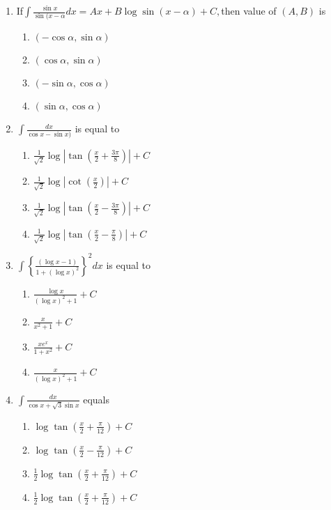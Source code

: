\documentclass[journal,12pt,twocolumn]{IEEEtran}
\theoremstyle{remark}
\begin{document}
 \begin{enumerate}
\item If$\int$$\frac{\sin x}{\sin (x-\alpha}dx = Ax+B\log \sin (x-\alpha)+C,$then value of $(A,B)$ is    \hfill        {}
\begin{enumerate}
       \item { $(-\cos \alpha, \sin \alpha)$ }  
       \item  $(\cos \alpha,\sin \alpha)$
       \item    $(-\sin \alpha,\cos \alpha)$   
       \item  $(\sin \alpha,\cos \alpha)$ 
\end{enumerate}

\item   $\int\frac{dx}{\cos x-\sin x)}$ is equal to             \hfill {}
      \begin{enumerate}
\item  $\frac{1}{\sqrt{2}}\log \left|\tan \left(\frac{x}{2}+\frac{3\pi}{8}\right)\right|+C$

\item  $\frac{1}{\sqrt{2}}\log \left|\cot \left(\frac{x}{2}\right)\right|+C$ 

\item  {$\frac{1}{\sqrt{2}}\log \left|\tan \left(\frac{x}{2}-\frac{3\pi}{8}\right)\right|+C$}

\item  {$\frac{1}{\sqrt{2}}\log \left|\tan \left(\frac{x}{2}-\frac{\pi}{8}\right)\right|+C$}
\end{enumerate}
\item  $\int\left\{ \frac{(\log x-1)}{1+(\log x)^2}\right\}^2 dx$ is equal to     \hfill {}
 \begin{enumerate} 
\item  $\frac{\log x}{(\log x)^2 +1}+C$         
\item  $\frac{x}{x^2+1}+C$
\item  $\frac{xe^x}{1+x^2}+C$                       
\item  $\frac{x}{(\log x)^2+1}+C$
\end{enumerate}
\item $\int \frac{dx}{\cos x + \sqrt{3} \sin x}$ equals \hfill {}
  \begin{enumerate}
\item  $\log \tan \left(\frac{x}{2}+\frac{\pi}{12}\right)+C$
\item  $\log \tan \left(\frac{x}{2}-\frac{\pi}{12}\right)+C$
\item  $\frac{1}{2} \log \tan \left(\frac{x}{2}+\frac{\pi}{12}\right)+C$
\item  $\frac{1}{2} \log \tan \left(\frac{x}{2}+\frac{\pi}{12}\right)+C$
\end{enumerate}
 \end{enumerate}
\end{document}
